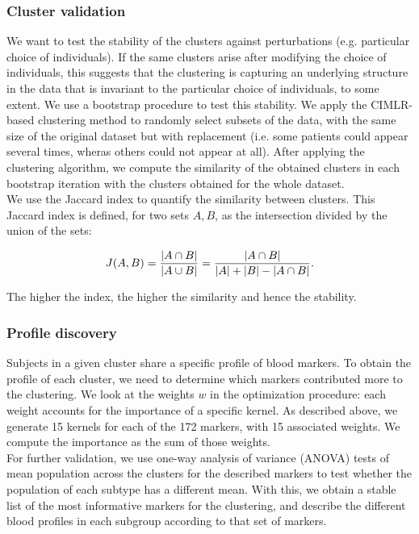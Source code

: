\subsubsection{Cluster validation}

We want to test the stability of the clusters against perturbations (e.g. particular choice of individuals). If the same clusters arise after modifying the choice of individuals, this suggests that the clustering is capturing an underlying structure in the data that is invariant to the particular choice of individuals, to some extent. We use a bootstrap procedure to test this stability. We apply the CIMLR-based clustering method to randomly select subsets of the data, with the same size of the original dataset but with replacement (i.e. some patients could appear several times, wheras others could not appear at all). After applying the clustering algorithm, we compute the similarity of the obtained clusters in each bootstrap iteration with the clusters obtained for the whole dataset. \\

We use the Jaccard index to quantify the similarity between clusters. This Jaccard index is defined, for two sets $A,B$, as the intersection divided by the union of the sets:

\begin{equation}
J(A,B) = {{|A \cap B|}\over{|A \cup B|}} = {{|A \cap B|}\over{|A| + |B| - |A \cap B|}}.
\end{equation}

The higher the index, the higher the similarity and hence the stability.

\subsubsection{Profile discovery}

Subjects in a given cluster share a specific profile of blood markers. To obtain the profile of each cluster, we need to determine which markers contributed more to the clustering. We look at the weights $w$ in the optimization procedure: each weight accounts for the importance of a specific kernel. As described above, we generate 15 kernels for each of the 172 markers, with 15 associated weights. We compute the importance as the sum of those weights. \\

For further validation, we use one-way analysis of variance (ANOVA) tests of mean population across the clusters for the described markers to test whether the population of each subtype has a different mean. With this, we obtain a stable list of the most informative markers for the clustering, and describe the different blood profiles in each subgroup according to that set of markers. \\

